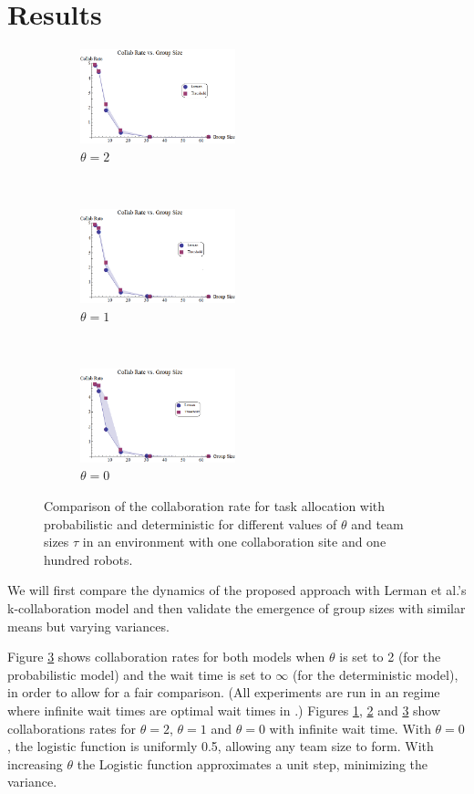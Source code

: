 \documentclass{TeXstyles/DARS/svmult}  %
\begin{document}
\section{Results}
\begin{figure}[!htb]
\begin{subfigure}{0.33\textwidth}
\centering\includegraphics[width=4.5cm]{figures/LermanCollabCompare3.png}
\centering\caption{$\theta=2$}\label{fig:lercol3}
\end{subfigure}~
\begin{subfigure}{0.33\textwidth}
\centering\includegraphics[width=4.5cm]{figures/LermanCollabCompare2.png}
\centering\caption{$\theta=1$}\label{fig:lercol2}
\end{subfigure}~
\begin{subfigure}{0.33\textwidth}
\centering\includegraphics[width=4.5cm]{figures/LermanCollabCompare1.png}
\centering\caption{$\theta=0$}\label{fig:lercol1}
\end{subfigure}
\caption{Comparison of the collaboration rate for task allocation with probabilistic and deterministic \cite{Lerman2001} for different values of $\theta$ and team sizes $\tau$ in an environment with one collaboration site and one hundred robots. }\label{fig:lercol}
\end{figure}

We will first compare the dynamics of the proposed approach with Lerman et al.'s k-collaboration model \cite{Lerman2001} and then validate the emergence of group sizes with similar means but varying variances.

Figure \ref{fig:lercol1} shows collaboration rates for both models when $\theta$ is set to 2 (for the probabilistic model) and the wait time is set to $\infty$ (for the deterministic model), in order to allow for a fair comparison. (All experiments are run in an regime where infinite wait times are optimal wait times in \cite{Lerman2001}.) Figures \ref{fig:lercol3}, \ref{fig:lercol2} and \ref{fig:lercol1} show collaborations rates for $\theta = 2$, $\theta = 1$ and $\theta=0$ with infinite wait time. With $\theta=0$, the logistic function is uniformly 0.5, allowing any team size to form.  
With increasing $\theta$ the Logistic function approximates a unit step, minimizing the variance. 
\end{document}
